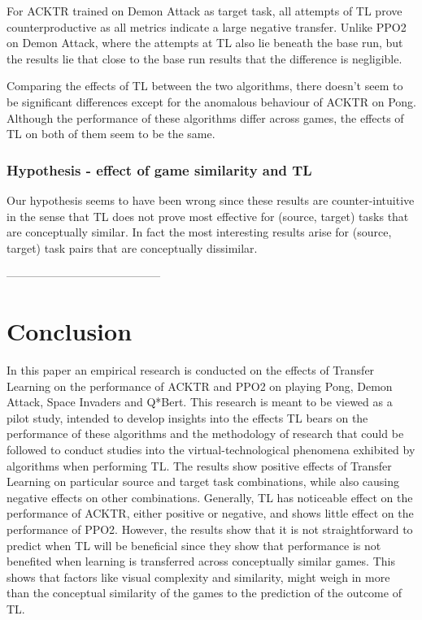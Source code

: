 For ACKTR trained on Demon Attack as target task, all attempts of TL prove counterproductive as all metrics indicate a large negative transfer. Unlike PPO2 on Demon Attack, where the attempts at TL also lie beneath the base run, but the results lie that close to the base run results that the difference is negligible.

Comparing the effects of TL between the two algorithms, there doesn’t seem to be significant differences except for the anomalous behaviour of ACKTR on Pong. Although the performance of these algorithms differ across games, the effects of TL on both of them seem to be the same. 

\subsubsection*{Hypothesis - effect of game similarity and TL}
Our hypothesis seems to have been wrong since these results are counter-intuitive in the sense that TL does not prove most effective for (source, target) tasks that are conceptually similar. In fact the most interesting results arise for (source, target) task pairs that are conceptually dissimilar.

-----------------------------------------
\section{Conclusion}
In this paper an empirical research is conducted on the effects of Transfer Learning on the performance of ACKTR and PPO2 on playing Pong, Demon Attack, Space Invaders and Q*Bert. This research is meant to be viewed as a pilot study, intended to develop insights into the effects TL bears on the performance of these algorithms and the methodology of research that could be followed to conduct studies into the virtual-technological phenomena exhibited by algorithms when performing TL. The results show positive effects of Transfer Learning on particular source and target task combinations, while also causing negative effects on other combinations. Generally, TL has noticeable effect on the performance of ACKTR, either positive or negative, and shows little effect on the performance of PPO2. However, the results show that it is not straightforward to predict when TL will be beneficial since they show that performance is not benefited when learning is transferred across conceptually similar games. This shows that factors like visual complexity and similarity, might weigh in more than the conceptual similarity of the games to the prediction of the outcome of TL.

